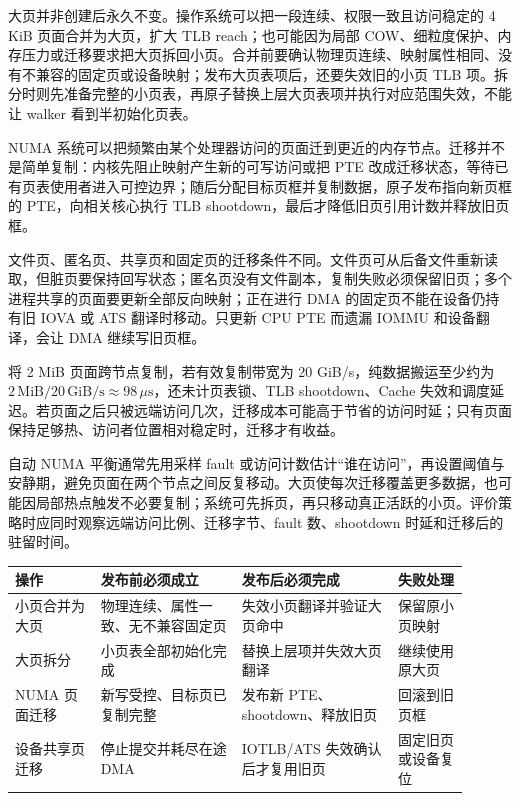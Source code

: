 大页并非创建后永久不变。操作系统可以把一段连续、权限一致且访问稳定的 4 KiB 页面合并为大页，扩大 TLB reach；也可能因为局部 COW、细粒度保护、内存压力或迁移要求把大页拆回小页。合并前要确认物理页连续、映射属性相同、没有不兼容的固定页或设备映射；发布大页表项后，还要失效旧的小页 TLB 项。拆分时则先准备完整的小页表，再原子替换上层大页表项并执行对应范围失效，不能让 walker 看到半初始化页表。


NUMA 系统可以把频繁由某个处理器访问的页面迁到更近的内存节点。迁移并不是简单复制：内核先阻止映射产生新的可写访问或把 PTE 改成迁移状态，等待已有页表使用者进入可控边界；随后分配目标页框并复制数据，原子发布指向新页框的 PTE，向相关核心执行 TLB shootdown，最后才降低旧页引用计数并释放旧页框。

文件页、匿名页、共享页和固定页的迁移条件不同。文件页可从后备文件重新读取，但脏页要保持回写状态；匿名页没有文件副本，复制失败必须保留旧页；多个进程共享的页面要更新全部反向映射；正在进行 DMA 的固定页不能在设备仍持有旧 IOVA 或 ATS 翻译时移动。只更新 CPU PTE 而遗漏 IOMMU 和设备翻译，会让 DMA 继续写旧页框。


将 2 MiB 页面跨节点复制，若有效复制带宽为 20 GiB/s，纯数据搬运至少约为 $2\,\mathrm{MiB}/20\,\mathrm{GiB/s}\approx98\,\mu\mathrm{s}$，还未计页表锁、TLB shootdown、Cache 失效和调度延迟。若页面之后只被远端访问几次，迁移成本可能高于节省的访问时延；只有页面保持足够热、访问者位置相对稳定时，迁移才有收益。

自动 NUMA 平衡通常先用采样 fault 或访问计数估计“谁在访问”，再设置阈值与安静期，避免页面在两个节点之间反复移动。大页使每次迁移覆盖更多数据，也可能因局部热点触发不必要复制；系统可先拆页，再只移动真正活跃的小页。评价策略时应同时观察远端访问比例、迁移字节、fault 数、shootdown 时延和迁移后的驻留时间。

\begin{longtable}{L{0.17\linewidth}L{0.28\linewidth}L{0.31\linewidth}L{0.14\linewidth}}
\toprule
操作 & 发布前必须成立 & 发布后必须完成 & 失败处理 \\
\midrule
小页合并为大页 & 物理连续、属性一致、无不兼容固定页 & 失效小页翻译并验证大页命中 & 保留原小页映射 \\\tablerowrule
大页拆分 & 小页表全部初始化完成 & 替换上层项并失效大页翻译 & 继续使用原大页 \\\tablerowrule
NUMA 页面迁移 & 新写受控、目标页已复制完整 & 发布新 PTE、shootdown、释放旧页 & 回滚到旧页框 \\\tablerowrule
设备共享页迁移 & 停止提交并耗尽在途 DMA & IOTLB/ATS 失效确认后才复用旧页 & 固定旧页或设备复位 \\
\bottomrule
\end{longtable}
